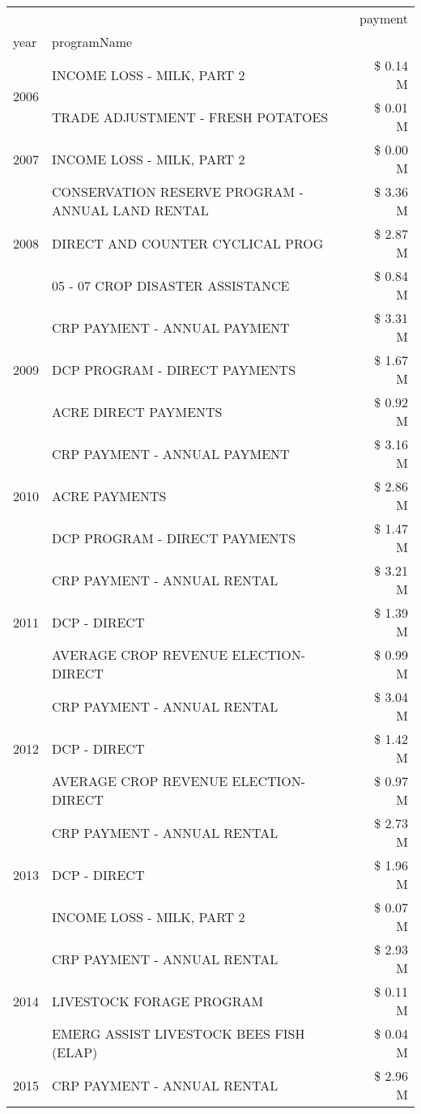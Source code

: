 \begin{tabular}{llr}
\toprule
 &  & payment \\
year & programName &  \\
\midrule
\multirow[t]{2}{*}{2006} & INCOME LOSS - MILK, PART 2 & \$ 0.14 M \\
 & TRADE ADJUSTMENT - FRESH POTATOES & \$ 0.01 M \\
\cline{1-3}
2007 & INCOME LOSS - MILK, PART 2 & \$ 0.00 M \\
\cline{1-3}
\multirow[t]{3}{*}{2008} & CONSERVATION RESERVE PROGRAM - ANNUAL LAND RENTAL & \$ 3.36 M \\
 & DIRECT AND COUNTER CYCLICAL PROG & \$ 2.87 M \\
 & 05 - 07 CROP DISASTER ASSISTANCE & \$ 0.84 M \\
\cline{1-3}
\multirow[t]{3}{*}{2009} & CRP PAYMENT - ANNUAL PAYMENT & \$ 3.31 M \\
 & DCP PROGRAM - DIRECT PAYMENTS & \$ 1.67 M \\
 & ACRE DIRECT PAYMENTS & \$ 0.92 M \\
\cline{1-3}
\multirow[t]{3}{*}{2010} & CRP PAYMENT - ANNUAL PAYMENT & \$ 3.16 M \\
 & ACRE PAYMENTS & \$ 2.86 M \\
 & DCP PROGRAM - DIRECT PAYMENTS & \$ 1.47 M \\
\cline{1-3}
\multirow[t]{3}{*}{2011} & CRP PAYMENT - ANNUAL RENTAL & \$ 3.21 M \\
 & DCP - DIRECT & \$ 1.39 M \\
 & AVERAGE CROP REVENUE ELECTION-DIRECT & \$ 0.99 M \\
\cline{1-3}
\multirow[t]{3}{*}{2012} & CRP PAYMENT - ANNUAL RENTAL & \$ 3.04 M \\
 & DCP - DIRECT & \$ 1.42 M \\
 & AVERAGE CROP REVENUE ELECTION-DIRECT & \$ 0.97 M \\
\cline{1-3}
\multirow[t]{3}{*}{2013} & CRP PAYMENT - ANNUAL RENTAL & \$ 2.73 M \\
 & DCP - DIRECT & \$ 1.96 M \\
 & INCOME LOSS - MILK, PART 2 & \$ 0.07 M \\
\cline{1-3}
\multirow[t]{3}{*}{2014} & CRP PAYMENT - ANNUAL RENTAL & \$ 2.93 M \\
 & LIVESTOCK FORAGE PROGRAM & \$ 0.11 M \\
 & EMERG ASSIST LIVESTOCK BEES FISH (ELAP) & \$ 0.04 M \\
\cline{1-3}
\multirow[t]{3}{*}{2015} & CRP PAYMENT - ANNUAL RENTAL & \$ 2.96 M \\

\end{tabular}
